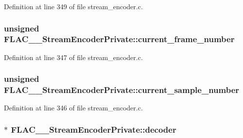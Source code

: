 Definition at line 349 of file stream\+\_\+encoder.\+c.

\subsubsection[{\texorpdfstring{current\+\_\+frame\+\_\+number}{current_frame_number}}]{\setlength{\rightskip}{0pt plus 5cm}unsigned F\+L\+A\+C\+\_\+\+\_\+\+Stream\+Encoder\+Private\+::current\+\_\+frame\+\_\+number}\hypertarget{struct_f_l_a_c_____stream_encoder_private_a3eea3d6f42bc6bbe4e841b8e159adb5b}{}\label{struct_f_l_a_c_____stream_encoder_private_a3eea3d6f42bc6bbe4e841b8e159adb5b}


Definition at line 347 of file stream\+\_\+encoder.\+c.

\subsubsection[{\texorpdfstring{current\+\_\+sample\+\_\+number}{current_sample_number}}]{\setlength{\rightskip}{0pt plus 5cm}unsigned F\+L\+A\+C\+\_\+\+\_\+\+Stream\+Encoder\+Private\+::current\+\_\+sample\+\_\+number}\hypertarget{struct_f_l_a_c_____stream_encoder_private_ae5fc015d13361e8a239cbed4096274eb}{}\label{struct_f_l_a_c_____stream_encoder_private_ae5fc015d13361e8a239cbed4096274eb}


Definition at line 346 of file stream\+\_\+encoder.\+c.

\subsubsection[{\texorpdfstring{decoder}{decoder}}]{$\ast$ F\+L\+A\+C\+\_\+\+\_\+\+Stream\+Encoder\+Private\+::decoder}\hypertarget{struct_f_l_a_c_____stream_encoder_private_a9404f84925aef85cee4b3deb43e6ab8b}{}\label{struct_f_l_a_c_____stream_encoder_private_a9404f84925aef85cee4b3deb43e6ab8b}


